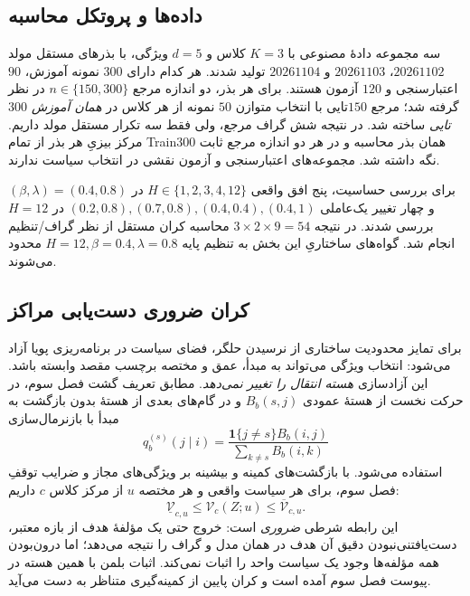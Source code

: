 \subsection{داده‌ها و پروتکل محاسبه}
\label{subsec:ch4-sec411-protocol}
سه مجموعه دادهٔ مصنوعی با $K=3$ کلاس و $d=5$ ویژگی، با بذرهای مستقل مولد $20261102$، $20261103$ و $20261104$ تولید شدند. هر کدام دارای $300$ نمونه آموزش، $90$ اعتبارسنجی و $120$ آزمون هستند. برای هر بذر، دو اندازه مرجع $n\in\{150,300\}$ در نظر گرفته شد؛ مرجع $150$تایی با انتخاب متوازن $50$ نمونه از هر کلاس در \emph{همان آموزش $300$تایی} ساخته شد. در نتیجه شش گراف مرجع، ولی فقط سه تکرار مستقل مولد داریم. مرکز بیزیِ هر بذر از تمام Train300 همان بذر محاسبه و در هر دو اندازه مرجع ثابت نگه داشته شد. مجموعه‌های اعتبارسنجی و آزمون نقشی در انتخاب سیاست ندارند.

برای بررسی حساسیت، پنج افق واقعی $H\in\{1,2,3,4,12\}$ در $(\beta,\lambda)=(0.4,0.8)$ و چهار تغییر یک‌عاملی $(0.2,0.8),(0.7,0.8),(0.4,0.4),(0.4,1)$ در $H=12$ بررسی شدند. در نتیجه $3\times2\times9=54$ محاسبه کران مستقل از نظر گراف/تنظیم انجام شد. گواه‌های ساختاریِ این بخش به تنظیم پایه $H=12,\beta=0.4,\lambda=0.8$ محدود می‌شوند.

\subsection{کران ضروری دست‌یابی مراکز}
\label{subsec:ch4-bayes-reachability}
برای تمایز محدودیت ساختاری از نرسیدن حلگر، فضای سیاست در برنامه‌ریزی پویا آزاد می‌شود: انتخاب ویژگی می‌تواند به مبدأ، عمق و مختصه برچسب مقصد وابسته باشد. این آزادسازی \emph{هسته انتقال را تغییر نمی‌دهد}. مطابق تعریف گشت فصل سوم، در حرکت نخست از هستهٔ عمودی $B_b(s,j)$ و در گام‌های بعدی از هستهٔ بدون بازگشت به مبدأ با بازنرمال‌سازی
\begin{equation}\label{eq:ch4-sec411-origin-excluded}
q_b^{(s)}(j\mid i)=
\frac{\mathbf1\{j\ne s\}B_b(i,j)}{\sum_{k\ne s}B_b(i,k)}
\end{equation}
استفاده می‌شود. با بازگشت‌های کمینه و بیشینه بر ویژگی‌های مجاز و ضرایب توقفِ فصل سوم، برای هر سیاست واقعی و هر مختصه $u$ از مرکز کلاس $c$ داریم:
\begin{equation}\label{eq:ch4-sec411-bellman-interval}
\boxed{\underline{\mathcal V}_{c,u}
\le \mathcal V_c(Z;u)\le \overline{\mathcal V}_{c,u}.}
\end{equation}
این رابطه شرطی \emph{ضروری} است: خروج حتی یک مؤلفهٔ هدف از بازه معتبر، دست‌یافتنی‌نبودن دقیق آن هدف در همان مدل و گراف را نتیجه می‌دهد؛ اما درون‌بودن همه مؤلفه‌ها وجود یک سیاست واحد را اثبات نمی‌کند. اثبات بلمن با همین هسته در پیوست فصل سوم آمده است و کران پایین از کمینه‌گیری متناظر به دست می‌آید.

